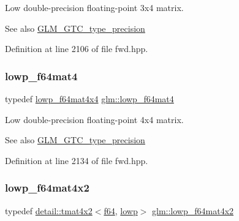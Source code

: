 Low double-\/precision floating-\/point 3x4 matrix. \begin{DoxySeeAlso}{See also}
\hyperlink{group__gtc__type__precision}{G\+L\+M\+\_\+\+G\+T\+C\+\_\+type\+\_\+precision} 
\end{DoxySeeAlso}


Definition at line 2106 of file fwd.\+hpp.

\mbox{\label{group__gtc__type__precision_ga4378d9384f1b24848043ccb02dcf2959}} 
\subsubsection{\texorpdfstring{lowp\+\_\+f64mat4}{lowp\_f64mat4}}
{\footnotesize\ttfamily typedef \hyperlink{group__gtc__type__precision_gab7d0922ed8d93ee3ce995858feb41231}{lowp\+\_\+f64mat4x4} \hyperlink{group__gtc__type__precision_ga4378d9384f1b24848043ccb02dcf2959}{glm\+::lowp\+\_\+f64mat4}}

Low double-\/precision floating-\/point 4x4 matrix. \begin{DoxySeeAlso}{See also}
\hyperlink{group__gtc__type__precision}{G\+L\+M\+\_\+\+G\+T\+C\+\_\+type\+\_\+precision} 
\end{DoxySeeAlso}


Definition at line 2134 of file fwd.\+hpp.

\mbox{\label{group__gtc__type__precision_ga37d10de43251a9a1be734bbb340ad2e7}} 
\subsubsection{\texorpdfstring{lowp\+\_\+f64mat4x2}{lowp\_f64mat4x2}}
{\footnotesize\ttfamily typedef \hyperlink{structglm_1_1detail_1_1tmat4x2}{detail\+::tmat4x2}$<$\hyperlink{group__gtc__type__precision_ga2bba392e555124b36cde6abba349bab3}{f64}, \hyperlink{namespaceglm_a0f04f086094c747d227af4425893f545ae161af3fc695e696ce3bf69f7332bc2d}{lowp}$>$ \hyperlink{group__gtc__type__precision_ga37d10de43251a9a1be734bbb340ad2e7}{glm\+::lowp\+\_\+f64mat4x2}}

